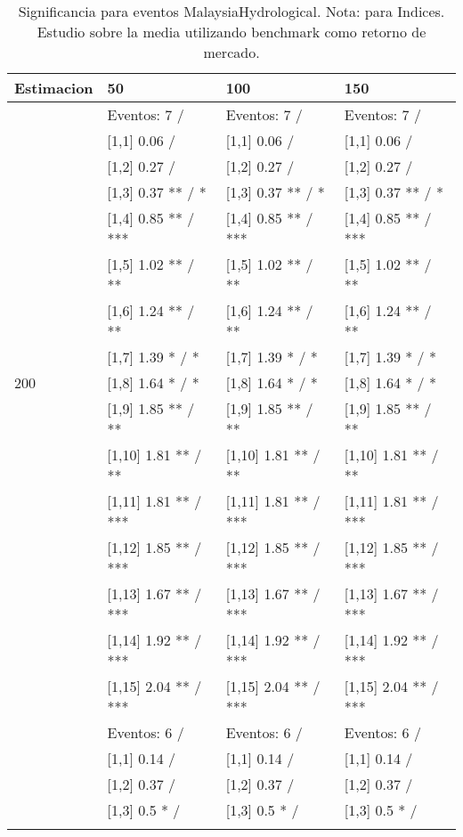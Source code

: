 \begin{table}

\caption{Significancia para eventos MalaysiaHydrological. Nota: para Indices. Estudio sobre la media utilizando benchmark como retorno de mercado.}
\centering
\begin{tabular}[t]{llll}
\toprule
Estimacion & 50 & 100 & 150\\
\midrule
 & Eventos:  7 / & Eventos:  7 / & Eventos:  7 /\\
 & {}[1,1] 0.06  / & {}[1,1] 0.06  / & {}[1,1] 0.06  /\\
 & {}[1,2] 0.27  / & {}[1,2] 0.27  / & {}[1,2] 0.27  /\\
 & {}[1,3] 0.37 ** / * & {}[1,3] 0.37 ** / * & {}[1,3] 0.37 ** / *\\
 & {}[1,4] 0.85 ** / *** & {}[1,4] 0.85 ** / *** & {}[1,4] 0.85 ** / ***\\
\addlinespace
 & {}[1,5] 1.02 ** / ** & {}[1,5] 1.02 ** / ** & {}[1,5] 1.02 ** / **\\
 & {}[1,6] 1.24 ** / ** & {}[1,6] 1.24 ** / ** & {}[1,6] 1.24 ** / **\\
 & {}[1,7] 1.39 * / * & {}[1,7] 1.39 * / * & {}[1,7] 1.39 * / *\\
200 & {}[1,8] 1.64 * / * & {}[1,8] 1.64 * / * & {}[1,8] 1.64 * / *\\
 & {}[1,9] 1.85 ** / ** & {}[1,9] 1.85 ** / ** & {}[1,9] 1.85 ** / **\\
\addlinespace
 & {}[1,10] 1.81 ** / ** & {}[1,10] 1.81 ** / ** & {}[1,10] 1.81 ** / **\\
 & {}[1,11] 1.81 ** / *** & {}[1,11] 1.81 ** / *** & {}[1,11] 1.81 ** / ***\\
 & {}[1,12] 1.85 ** / *** & {}[1,12] 1.85 ** / *** & {}[1,12] 1.85 ** / ***\\
 & {}[1,13] 1.67 ** / *** & {}[1,13] 1.67 ** / *** & {}[1,13] 1.67 ** / ***\\
 & {}[1,14] 1.92 ** / *** & {}[1,14] 1.92 ** / *** & {}[1,14] 1.92 ** / ***\\
\addlinespace
 & {}[1,15] 2.04 ** / *** & {}[1,15] 2.04 ** / *** & {}[1,15] 2.04 ** / ***\\
 & Eventos:  6 / & Eventos:  6 / & Eventos:  6 /\\
 & {}[1,1] 0.14  / & {}[1,1] 0.14  / & {}[1,1] 0.14  /\\
 & {}[1,2] 0.37  / & {}[1,2] 0.37  / & {}[1,2] 0.37  /\\
 & {}[1,3] 0.5 * / & {}[1,3] 0.5 * / & {}[1,3] 0.5 * /\\
\addlinespace

\end{tabular}
\end{table}
